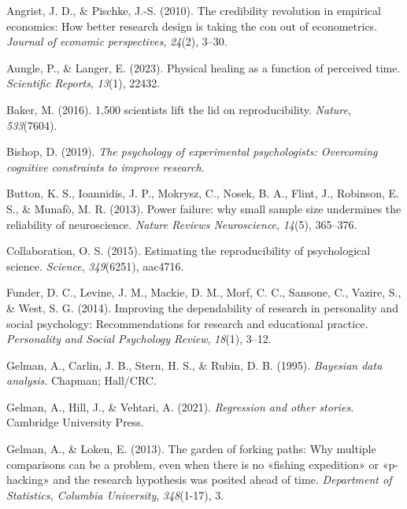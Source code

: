 \documentclass[
  letterpaper,
]{krantz}
\newlength{\cslhangindent}
\newenvironment{CSLReferences}[2] %
 {\begin{list}{}{%
  \setlength{\itemindent}{0pt}
  \setlength{\leftmargin}{0pt}
  \setlength{\parsep}{0pt}
  \ifodd #1
   \setlength{\leftmargin}{\cslhangindent}
   \setlength{\itemindent}{-1\cslhangindent}
  \fi
  \setlength{\itemsep}{#2\baselineskip}}}
 {\end{list}}
\begin{document}

\label{refs}
\begin{CSLReferences}{1}{0}
Angrist, J. D., \& Pischke, J.-S. (2010). The credibility revolution in
empirical economics: How better research design is taking the con out of
econometrics. \emph{Journal of economic perspectives}, \emph{24}(2),
3--30.

Aungle, P., \& Langer, E. (2023). Physical healing as a function of
perceived time. \emph{Scientific Reports}, \emph{13}(1), 22432.

Baker, M. (2016). 1,500 scientists lift the lid on reproducibility.
\emph{Nature}, \emph{533}(7604).

Bishop, D. (2019). \emph{The psychology of experimental psychologists:
Overcoming cognitive constraints to improve research}.

Button, K. S., Ioannidis, J. P., Mokrysz, C., Nosek, B. A., Flint, J.,
Robinson, E. S., \& Munafò, M. R. (2013). Power failure: why small
sample size undermines the reliability of neuroscience. \emph{Nature
Reviews Neuroscience}, \emph{14}(5), 365--376.

Collaboration, O. S. (2015). Estimating the reproducibility of
psychological science. \emph{Science}, \emph{349}(6251), aac4716.

Funder, D. C., Levine, J. M., Mackie, D. M., Morf, C. C., Sansone, C.,
Vazire, S., \& West, S. G. (2014). Improving the dependability of
research in personality and social psychology: Recommendations for
research and educational practice. \emph{Personality and Social
Psychology Review}, \emph{18}(1), 3--12.

Gelman, A., Carlin, J. B., Stern, H. S., \& Rubin, D. B. (1995).
\emph{Bayesian data analysis}. Chapman; Hall/CRC.

Gelman, A., Hill, J., \& Vehtari, A. (2021). \emph{Regression and other
stories}. Cambridge University Press.

Gelman, A., \& Loken, E. (2013). The garden of forking paths: Why
multiple comparisons can be a problem, even when there is no {«fishing
expedition»} or {«p-hacking»} and the research hypothesis was posited
ahead of time. \emph{Department of Statistics, Columbia University},
\emph{348}(1-17), 3.


\end{CSLReferences}
\end{document}
